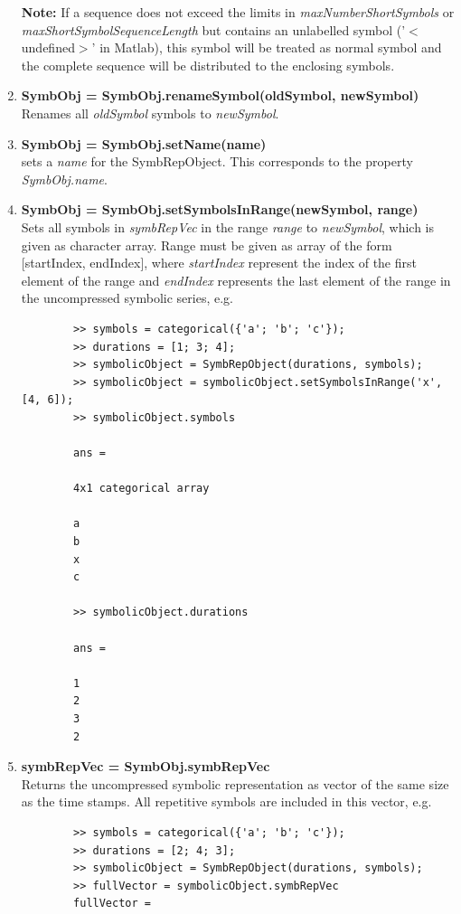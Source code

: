 \documentclass[a4]{scrreprt}
\begin{document}
\begin{enumerate}
			\textbf{Note:} If a sequence does not exceed the limits in \textit{maxNumberShortSymbols} or \textit{maxShortSymbolSequenceLength} but contains an unlabelled symbol ('$<$undefined$>$' in Matlab), this symbol will be treated as normal symbol and the complete sequence will be distributed to the enclosing symbols.
	
	\item \textbf{SymbObj = SymbObj.renameSymbol(oldSymbol, newSymbol)}\\
		Renames all \textit{oldSymbol} symbols to \textit{newSymbol}.
		
	\item \textbf{SymbObj = SymbObj.setName(name)}\\
		sets a \textit{name} for the SymbRepObject. This corresponds to the property \textit{SymbObj.name}.
	
	\item \textbf{SymbObj = SymbObj.setSymbolsInRange(newSymbol, range)}\\
		Sets all symbols in \textit{symbRepVec} in the range \textit{range} to \textit{newSymbol}, which is given as character array. Range must be given as array of the form [startIndex, endIndex], where \textit{startIndex} represent the index of the first element of the range and \textit{endIndex} represents the last element of the range in the uncompressed symbolic series, e.g.
		\begin{verbatim}
		>> symbols = categorical({'a'; 'b'; 'c'});
		>> durations = [1; 3; 4];
		>> symbolicObject = SymbRepObject(durations, symbols);
		>> symbolicObject = symbolicObject.setSymbolsInRange('x', [4, 6]);
		>> symbolicObject.symbols
		
		ans = 
		
		4x1 categorical array
		
		a 
		b 
		x 
		c 
		
		>> symbolicObject.durations
		
		ans =
		
		1
		2
		3
		2	
		\end{verbatim}
		
	\item \textbf{symbRepVec = SymbObj.symbRepVec}\\
		Returns the uncompressed symbolic representation as vector of the same size as the time stamps. All repetitive symbols are included in this vector, e.g.	
		\begin{verbatim}
		>> symbols = categorical({'a'; 'b'; 'c'});
		>> durations = [2; 4; 3];
		>> symbolicObject = SymbRepObject(durations, symbols);
		>> fullVector = symbolicObject.symbRepVec
		fullVector = 
		

\end{verbatim}
\end{enumerate}
\end{document}
